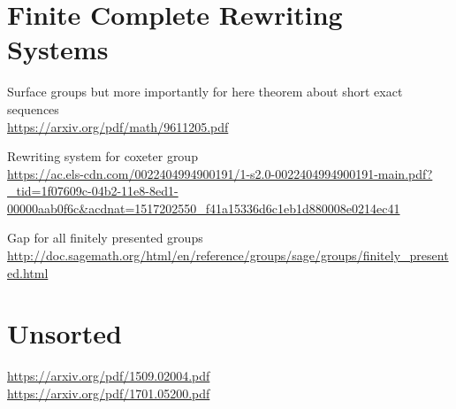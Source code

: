\documentclass[11pt]{article}
\theoremstyle{change}
\theoremstyle{nonumberplain}
\numberwithin{equation}{section}
\begin{document}
\section{Finite Complete Rewriting Systems}

Surface groups but more importantly for here theorem about short exact sequences\\
\url{https://arxiv.org/pdf/math/9611205.pdf}

Rewriting system for coxeter group\\
\url{https://ac.els-cdn.com/0022404994900191/1-s2.0-0022404994900191-main.pdf?_tid=1f07609c-04b2-11e8-8ed1-00000aab0f6c&acdnat=1517202550_f41a15336d6c1eb1d880008e0214ec41}

Gap for all finitely presented groups\\
\url{http://doc.sagemath.org/html/en/reference/groups/sage/groups/finitely_presented.html}

\section{Unsorted}

\url{https://arxiv.org/pdf/1509.02004.pdf}\\
\url{https://arxiv.org/pdf/1701.05200.pdf}
\end{document}
